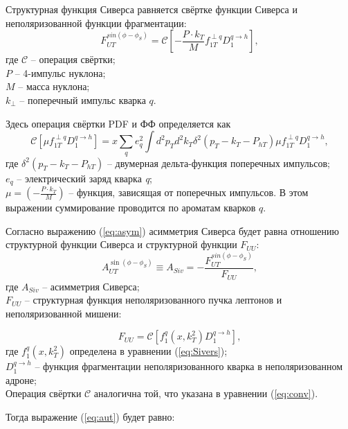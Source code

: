 \documentclass{extreport}
\begin{document}
Структурная функция Сиверса равняется свёртке функции Сиверса и неполяризованной функции фрагментации:
\begin{equation}
	\label{eq:Fsiv}
	F^{sin(\phi-\phi_S)}_{UT} = \mathcal{C}\left [-\frac{P\cdot k_T}{M}f_{1T}^{\perp q}D_1^{q \rightarrow h} \right],
\end{equation}
где $\mathcal{C}$ -- операция свёртки; \\ $P$ -- 4-импульс нуклона; \\ $M$ -- масса нуклона; \\ $k_{\perp}$ -- поперечный импульс кварка $q$. 

Здесь операция свёртки PDF и ФФ определяется как
\begin{equation}
	\label{eq:conv}
	\mathcal{C} [\mu f_{1T}^{\perp q}D_1^{q \rightarrow h}] = x \sum_{q} e_q^2 \int d^2 p_{T} d^2 k_{T} \delta^2(p_T - k_T - P_{hT}) \mu f_{1T}^{\perp q}D_1^{q \rightarrow h}, 
\end{equation}
где $\delta^2 (p_T - k_T - P_{hT})$ -- двумерная дельта-функция поперечных импульсов; \\ 
$e_q$ -- электрический заряд кварка \textit{q}; \\
$\mu =  (-\frac{P\cdot k_T}{M})$ -- функция, зависящая от поперечных импульсов. В этом выражении суммирование проводится по ароматам кварков $q$. 

Согласно выражению (\ref{eq:asym}) асимметрия Сиверса будет равна отношению структурной функции Сиверса и структурной функции $F_{UU}$: 
\begin{equation}
	\label{eq:aut}
	A_{UT}^{\sin(\phi-\phi_S)} \equiv A_{Siv} = - \frac{F^{sin(\phi-\phi_S)}_{UT}}{F_{UU}}, 
\end{equation}
где $A_{Siv}$ -- асимметрия Сиверса; \\
$F_{UU}$ -- структурная функция неполяризованного пучка лептонов и неполяризованной мишени:

\begin{equation}
	F_{UU} = \mathcal{C} \left[f_1^q (x,k^2_T ) D_1^{q \rightarrow h} \right],
\end{equation}
где $f_1^q (x,k^2_T )$ определена в уравнении (\ref{eq:Sivers}); \\
$D_1^{q \rightarrow h}$ -- функция фрагментации неполяризованного кварка в неполяризованном адроне; \\
Операция свёртки $\mathcal{C}$ аналогична той, что указана в уравнении (\ref{eq:conv}).

Тогда выражение (\ref{eq:aut}) будет равно:
\end{document}
